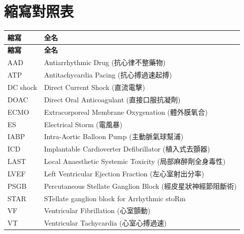 \documentclass[12pt,a4paper]{article}
\begin{document}
\section{縮寫對照表}

\begin{longtable}{p{4cm}p{10cm}}
\toprule
\textbf{縮寫} & \textbf{全名} \\
\midrule
\endfirsthead

\toprule
\textbf{縮寫} & \textbf{全名} \\
\midrule
\endhead

\bottomrule
\endfoot

AAD & Antiarrhythmic Drug (抗心律不整藥物) \\
ATP & Antitachycardia Pacing (抗心搏過速起搏) \\
DC shock & Direct Current Shock (直流電擊) \\
DOAC & Direct Oral Anticoagulant (直接口服抗凝劑) \\
ECMO & Extracorporeal Membrane Oxygenation (體外膜氧合) \\
ES & Electrical Storm (電風暴) \\
IABP & Intra-Aortic Balloon Pump (主動脈氣球幫浦) \\
ICD & Implantable Cardioverter Defibrillator (植入式去顫器) \\
LAST & Local Anaesthetic Systemic Toxicity (局部麻醉劑全身毒性) \\
LVEF & Left Ventricular Ejection Fraction (左心室射出分率) \\
PSGB & Percutaneous Stellate Ganglion Block (經皮星狀神經節阻斷術) \\
STAR & STellate ganglion block for Arrhythmic stoRm \\
VF & Ventricular Fibrillation (心室顫動) \\
VT & Ventricular Tachycardia (心室心搏過速) \\
\bottomrule
\end{longtable}
\end{document}
